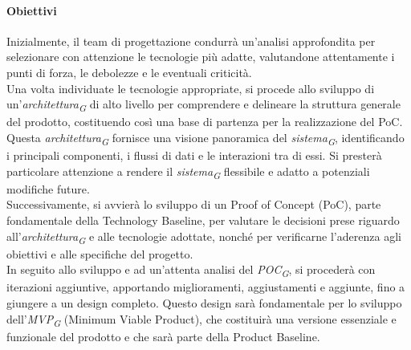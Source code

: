 \paragraph{Obiettivi}
Inizialmente, il team di progettazione condurrà un'analisi approfondita per selezionare con attenzione le tecnologie più adatte, valutandone attentamente i punti di forza, le debolezze e le eventuali criticità. \\
Una volta individuate le tecnologie appropriate, si procede allo sviluppo di un'\textit{architettura}\textsubscript{\textit{G}} di alto livello per comprendere e delineare la struttura generale del prodotto, costituendo così una base di partenza per la realizzazione del PoC.
Questa \textit{architettura}\textsubscript{\textit{G}} fornisce una visione panoramica del \textit{sistema}\textsubscript{\textit{G}}, identificando i principali componenti, i flussi di dati e le interazioni tra di essi. Si presterà particolare attenzione a rendere il \textit{sistema}\textsubscript{\textit{G}} flessibile e adatto a potenziali modifiche future. \\
Successivamente, si avvierà lo sviluppo di un Proof of Concept (PoC), parte fondamentale della Technology Baseline, per valutare le decisioni prese riguardo all'\textit{architettura}\textsubscript{\textit{G}} e alle tecnologie adottate, nonché per verificarne l'aderenza agli obiettivi e alle specifiche del progetto. \\
In seguito allo sviluppo e ad un'attenta analisi del \textit{POC}\textsubscript{\textit{G}}, si procederà con iterazioni aggiuntive, apportando miglioramenti, aggiustamenti e aggiunte, fino a giungere a un design completo. Questo design sarà fondamentale per lo sviluppo dell'\textit{MVP}\textsubscript{\textit{G}} (Minimum Viable Product), che costituirà una versione essenziale e funzionale del prodotto e che sarà parte della Product Baseline.

